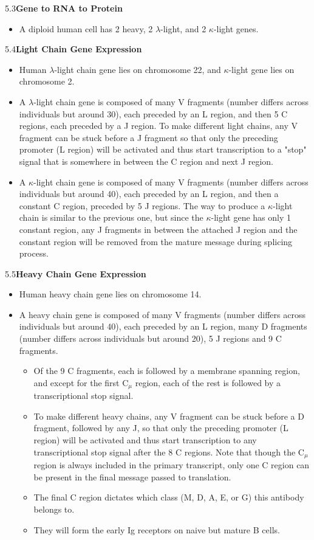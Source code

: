 \documentclass[UTF8]{book}
\begin{document}
5.3\quad \textbf{Gene to RNA to Protein}
\begin{itemize}
\item A diploid human cell has 2 heavy, 2 $\lambda$-light, and 2 $\kappa$-light genes.
\end{itemize}
5.4\quad \textbf{Light Chain Gene Expression}
\begin{itemize}
\item Human $\lambda$-light chain gene lies on chromosome 22, and $\kappa$-light gene lies on chromosome 2.
\item A $\lambda$-light chain gene is composed of many V fragments (number differs across individuals but around 30), each preceded by an L region, and then 5 C regions, each preceded by a J region. To make different light chains, any V fragment can be stuck before a J fragment so that only the preceding promoter (L region) will be activated and thus start transcription to a "stop" signal that is somewhere in between the C region and next J region.
\item A $\kappa$-light chain gene is composed of many V fragments (number differs across individuals but around 40), each preceded by an L region, and then a constant C region, preceded by 5 J regions. The way to produce a $\kappa$-light chain is similar to the previous one, but since the $\kappa$-light gene has only 1 constant region, any J fragments in between the attached J region and the constant region will be removed from the mature message during splicing process.
\end{itemize}
5.5\quad \textbf{Heavy Chain Gene Expression}
\begin{itemize}
\item Human heavy chain gene lies on chromosome 14.
\item A heavy chain gene is composed of many V fragments (number differs across individuals but around 40), each preceded by an L region, many D fragments (number differs across individuals but around 20), 5 J regions and 9 C fragments. 
\begin{itemize}
	\item Of the 9 C fragments, each is followed by a membrane spanning region, and except for the first C$_\mu$ region, each of the rest is followed by a transcriptional stop signal.
	\item To make different heavy chains, any V fragment can be stuck before a D fragment, followed by any J, so that only the preceding promoter (L region) will be activated and thus start transcription to any transcriptional stop signal after the 8 C regions. Note that though the C$_\mu$ region is always included in the primary transcript, only one C region can be present in the final message passed to translation.
	\item The final C region dictates which class (M, D, A, E, or G) this antibody belongs to.
	\item They will form the early Ig receptors on naive but mature B cells.
\end{itemize}
\end{itemize}
\end{document}

